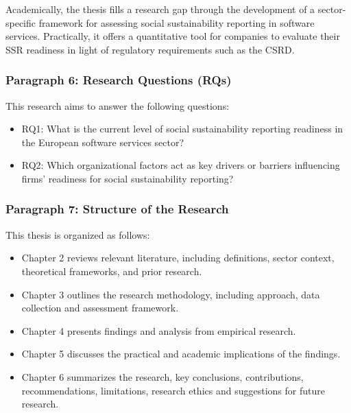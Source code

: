 Academically, the thesis fills a research gap through the 
development of a sector-specific framework for assessing social sustainability
reporting in software services. Practically, it offers a quantitative tool 
for companies to evaluate their SSR readiness in light of regulatory 
requirements such as the CSRD.

\subsubsection{Paragraph 6: Research Questions (RQs)}
This research aims to answer the following questions:
\begin{itemize}
    \item RQ1: What is the current level of social sustainability reporting readiness 
    in the European software services sector?
    \item RQ2: Which organizational factors act as key drivers or barriers 
    influencing firms' readiness for social sustainability reporting?
\end{itemize}

\subsubsection{Paragraph 7: Structure of the Research}
This thesis is organized as follows:
\begin{itemize}
    \item Chapter 2 reviews relevant literature, including definitions, 
    sector context, theoretical frameworks, and prior research.
    \item Chapter 3 outlines the research methodology, including approach, 
    data collection and assessment framework.
    \item Chapter 4 presents findings and analysis from empirical research.
    \item Chapter 5 discusses the practical and academic implications of the findings.
    \item Chapter 6 summarizes the research, key conclusions, contributions, 
    recommendations, limitations, research ethics and suggestions for future research.
\end{itemize}